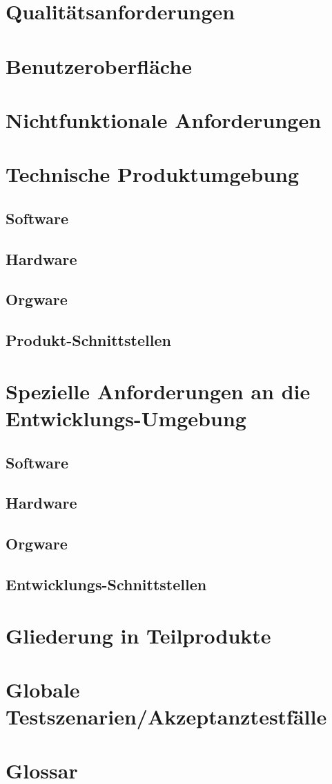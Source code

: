 \documentclass[12pt, a4paper]{article}
\begin{document}
\section{Qualitätsanforderungen}
\pagebreak

\section{Benutzeroberfläche}
\pagebreak

\section{Nichtfunktionale Anforderungen}
\pagebreak

\section{Technische Produktumgebung}
\subsection{Software}
\subsection{Hardware}
\subsection{Orgware}
\subsection{Produkt-Schnittstellen}
\pagebreak

\section{Spezielle Anforderungen an die Entwicklungs-Umgebung}
\subsection{Software}
\subsection{Hardware}
\subsection{Orgware}
\subsection{Entwicklungs-Schnittstellen}
\pagebreak

\section{Gliederung in Teilprodukte}
\pagebreak

\section{Globale Testszenarien/Akzeptanztestfälle}
\pagebreak

\section{Glossar}
\pagebreak
\end{document}
